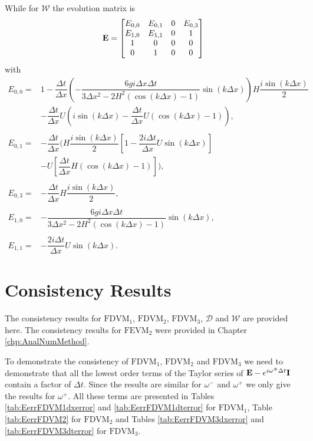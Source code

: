 While for $\mathcal{W}$ the evolution matrix is 
\begin{equation}
\label{eqn:AppEvolW}
\mathbf{E} = \begin{bmatrix}
{E}_{0,0} & {E}_{0,1} & 0 & E_{0,3} \\
{E}_{1,0} & E_{1,1} &0 & 1 \\
1&0&0&0\\
0&1&0&0
\end{bmatrix}
\end{equation}
with
\begin{align*}
{E}_{0,0} = &1 - \dfrac{\Delta t}{\Delta x}\left(-\dfrac{6 gi \Delta x\Delta t}{3 \Delta x^2 -2{H^2} \left( \cos\left(k \Delta x\right) - 1 \right)}{ \sin\left(k \Delta x\right)}\right)H\dfrac{i\sin\left(k\Delta x\right)}{2} \\  & - \dfrac{\Delta t}{\Delta x}U\left(i\sin\left(k\Delta x\right) - \dfrac{\Delta t}{\Delta x}U\left(\cos\left(k\Delta x\right) - 1\right)\right), \\ \\
{E}_{0,1} = &- \dfrac{\Delta t}{\Delta x} \Bigg(H\dfrac{i\sin\left(k\Delta x\right)}{2}\left[ 1 -\dfrac{2i \Delta t }{\Delta x} U \sin\left(k \Delta x\right) \right] \\ & -U\left[\dfrac{\Delta t}{\Delta x}H\left(\cos\left(k\Delta x\right) - 1\right)\right] \Bigg),\\ \\
E_{0,3} = &- \dfrac{\Delta t}{\Delta x}H\dfrac{i\sin\left(k\Delta x\right)}{2},  \\ \\
 {E}_{1,0} = &-\dfrac{6 gi \Delta x\Delta t}{3 \Delta x^2 -2{H^2} \left( \cos\left(k \Delta x\right) - 1 \right)}{ \sin\left(k \Delta x\right)}, \\ \\
{E}_{1,1} = &-\dfrac{2i \Delta t }{\Delta x} U \sin\left(k \Delta x\right).
\end{align*}

\section{Consistency Results}
The consistency results for $\text{FDVM}_1$, $\text{FDVM}_2$, $\text{FDVM}_3$, $\mathcal{D}$ and $\mathcal{W}$ are provided here. The consistency results for $\text{FEVM}_2$ were provided in Chapter \ref{chp:AnalNumMethod}.   

To demonstrate the consistency of $\text{FDVM}_1$, $\text{FDVM}_2$ and $\text{FDVM}_3$ we need to demonstrate that all the lowest order terms of the Taylor series of $\mathbf{E}- e^{i\omega^\pm \Delta t } \mathbf{I}$ contain a factor of $\Delta t$. Since the results are similar for $\omega^-$ and $\omega^+$ we only give the results for $\omega^+$. All these terms are presented in Tables \ref{tab:EerrFDVM1dxerror} and \ref{tab:EerrFDVM1dterror} for $\text{FDVM}_1$, Table \ref{tab:EerrFDVM2} for $\text{FDVM}_2$ and Tables \ref{tab:EerrFDVM3dxerror} and \ref{tab:EerrFDVM3dterror} for $\text{FDVM}_3$.


